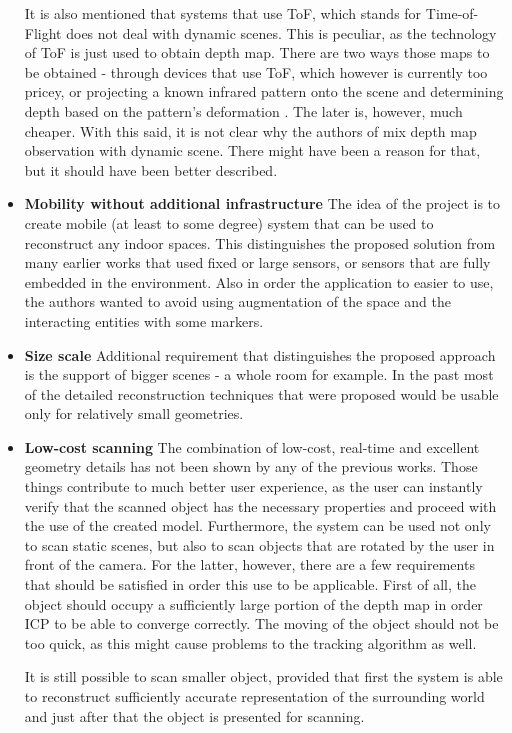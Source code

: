 \documentclass[12pt]{article}
\theoremstyle{plain}
\begin{document}
\begin{itemize}
      It is also mentioned that systems that use ToF, which stands for
      Time-of-Flight does not deal with dynamic scenes. This is peculiar, as the
      technology of ToF is just used to obtain depth map. There are two ways
      those maps to be obtained - through devices that use ToF, which however is
      currently too pricey, or projecting a known infrared pattern onto the
      scene and determining depth based on the pattern's deformation
      \cite{body-scanning}. The later is, however, much cheaper. With this said,
      it is not clear why the authors of \cite{kinectfusion} mix depth map
      observation with dynamic scene. There might have been a reason for that,
      but it should have been better described.
    \item \textbf{Mobility without additional infrastructure} The idea of the
      project is to create mobile (at least to some degree) system that can be
      used to reconstruct any indoor spaces. This distinguishes the proposed
      solution from many earlier works that used fixed or large sensors, or
      sensors that are fully embedded in the environment. Also in order the
      application to easier to use, the authors wanted to avoid using
      augmentation of the space and the interacting entities with some markers.
    \item \textbf{Size scale} Additional requirement that distinguishes the
      proposed approach is the support of bigger scenes - a whole room for
      example. In the past most of the detailed reconstruction techniques that
      were proposed would be usable only for relatively small geometries.
    \item \textbf{Low-cost scanning} The combination of low-cost, real-time and
      excellent geometry details has not been shown by any of the previous
      works. Those things contribute to much better user experience, as the user
      can instantly verify that the scanned object has the necessary properties
      and proceed with the use of the created model. Furthermore, the system can
      be used not only to scan static scenes, but also to scan objects that are
      rotated by the user in front of the camera. For the latter, however, there
      are a few requirements that should be satisfied in order this use to be
      applicable. First of all, the object should occupy a sufficiently large
      portion of the depth map in order ICP to be able to converge correctly.
      The moving of the object should not be too quick, as this might cause
      problems to the tracking algorithm as well.

      It is still possible to scan smaller object, provided that first the
      system is able to reconstruct sufficiently accurate representation of the
      surrounding world and just after that the object is presented for
      scanning.
  \end{itemize}
\end{document}

